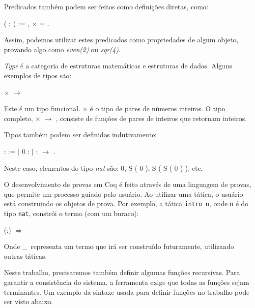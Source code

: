 Predicados também podem ser feitos como definições diretas, como:

\bigskip
{}  ( : ) :=
\coqdoctac{\ensuremath{\exists}} , 
\ensuremath{\times}  = .\coqdoceol
\bigskip

Assim, podemos utilizar estes predicados como propriedades de algum objeto,
provando algo como \emph{even(2)} ou \emph{sqr(4)}.

\emph{Type} é a categoria de estruturas matemáticas e estruturas de dados.
Alguns exemplos de tipos são:

\bigskip
{} \ensuremath{\times} 
\ensuremath{\rightarrow} 
\bigskip

Este é um tipo funcional.   \ensuremath{\times}
 é o tipo de pares de números inteiros. O tipo completo,
 \ensuremath{\times} 
\ensuremath{\rightarrow} , consiste de funções de pares
de inteiros que retornam inteiros.

Tipos também podem ser definidos indutivamente:

\bigskip
{}  :  :=\coqdoceol
\coqdocindent{2.00em} \ensuremath{|} 0 : \coqdoceol 
\coqdocindent{2.00em} \ensuremath{|}  :  \ensuremath{\rightarrow}
.\coqdoceol
\bigskip

Neste caso, elementos do tipo \emph{nat} são: 0, S ( 0 ), S ( S ( 0 ) ), etc.

O desenvolvimento de provas em Coq é feito através de uma linguagem de provas,
que permite um processo guiado pelo usuário. Ao utilizar uma tática, o usuário
está construindo os objetos de prova. Por exemplo, a tática
\texttt{intro n}, onde \texttt{n} é do tipo \texttt{nat}, constrói o termo (com um
buraco):

\bigskip
{} (:) \ensuremath{\Rightarrow} \coqdocvar{\_}\coqdoceol
\bigskip

Onde \_\ representa um termo que irá ser construído futuramente, utilizando
outras táticas. 

Neste trabalho, precisaremos também definir algumas funções recursivas. Para
garantir a consistência do sistema, a ferramenta exige que todas as funções
sejam terminantes. Um exemplo da sintaxe usada para definir funções no trabalho
pode ser visto abaixo.

